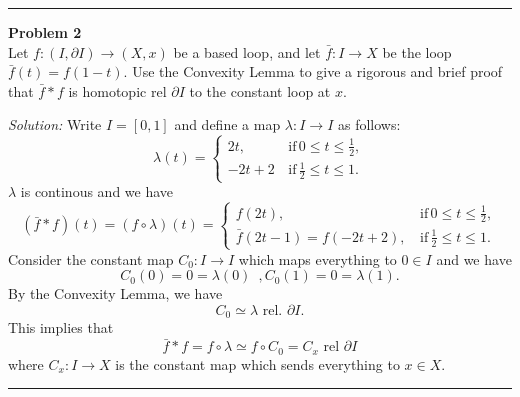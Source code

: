 \documentclass[a4paper, 12pt]{article}
\newenvironment{problem}[2][Problem]
    { \begin{mdframed}[backgroundcolor=gray!20] \textbf{#1 #2} \\}
    {  \end{mdframed}}
\newenvironment{solution}
    {\textit{Solution:}}
    {}
\begin{document}
\noindent\rule{7in}{2.8pt}

\begin{problem}{2}
Let \(f:(I,\partial I)\rightarrow (X,x)\) be a based loop, and let \(\bar{f}:I\rightarrow X\) be the loop \(\bar{f}(t)=f(1-t)\). Use the Convexity Lemma to give a rigorous and brief proof that 
\(\bar{f}*f\) is homotopic rel \(\partial I\) to the constant loop at \(x\).
\end{problem}
\begin{solution}
Write \(I=[0,1]\) and define a map \(\lambda:I\rightarrow I\) as follows:
\[\lambda(t)=\begin{cases}
    2t,&\, \text{if}\, 0\leq t\leq \frac{1}{2},\\ 
    -2t+2&\, \text{if}\, \frac{1}{2}\leq t\leq 1.
\end{cases}\]
\(\lambda\) is continous and we have
\[(\bar{f}*f)(t)=(f\circ \lambda)(t)=\begin{cases}
    f(2t),&\, \text{if}\, 0\leq t\leq \frac{1}{2},\\ 
    \bar{f}(2t-1)=f(-2t+2),&\, \text{if}\, \frac{1}{2}\leq t\leq 1.
\end{cases}\]
Consider the constant map \(C_0:I\rightarrow I\) which maps everything to \(0\in I\) and we have 
\[C_0(0)=0=\lambda(0)\,\,\, ,C_0(1)=0=\lambda(1).\]
By the Convexity Lemma, we have 
\[C_0\simeq \lambda\,\, \text{rel.}\,\, \partial I.\]
This implies that 
\[\bar{f}*f=f\circ \lambda\simeq f\circ C_0=C_x\,\, \text{rel}\,\, \partial I\]
where \(C_x:I\rightarrow X\) is the constant map which sends everything to \(x\in X\). 
\end{solution}

\noindent\rule{7in}{2.8pt}
\end{document}
